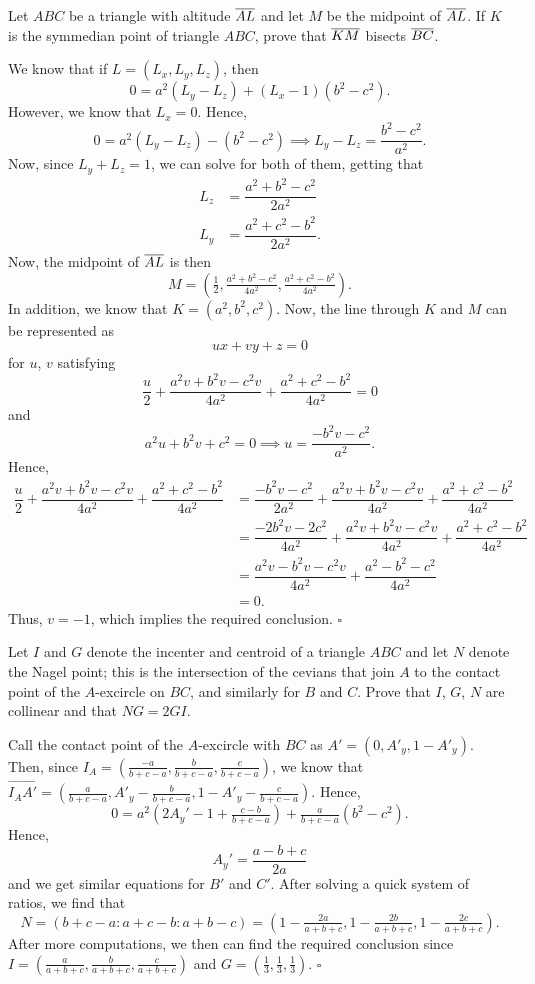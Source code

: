 \documentclass{article}
\begin{document}
\begin{problem}[7.31]{}
Let $ABC$ be a triangle with altitude $\overline{AL}$ and let $M$ be the midpoint of $\overline{AL}$. If $K$ is the symmedian point of triangle $ABC$, prove that $\overline{KM}$ bisects $\overline{BC}$.
\end{problem}
We know that if $L = (L_x, L_y, L_z)$, then \[0 = a^2(L_y-L_z)+(L_x-1)(b^2-c^2).\] However, we know that $L_x = 0$. Hence, \[0 = a^2(L_y-L_z)-(b^2-c^2) \implies L_y-L_z = \dfrac{b^2-c^2}{a^2}.\] Now, since $L_y + L_z = 1$, we can solve for both of them, getting that
\begin{align*}
L_z &= \dfrac{a^2+b^2-c^2}{2a^2} \\
L_y &= \dfrac{a^2+c^2-b^2}{2a^2}.
\end{align*}
Now, the midpoint of $\overline{AL}$ is then \[M = \left(\tfrac{1}{2}, \tfrac{a^2+b^2-c^2}{4a^2}, \tfrac{a^2+c^2-b^2}{4a^2}\right).\] In addition, we know that $K = (a^2, b^2, c^2)$. Now, the line through $K$ and $M$ can be represented as \[ux+vy+z = 0\] for $u$, $v$ satisfying \[\dfrac{u}{2}+\dfrac{a^2v+b^2v-c^2v}{4a^2}+\dfrac{a^2+c^2-b^2}{4a^2} = 0\] and \[a^2u+b^2v+c^2 = 0 \implies u = \dfrac{-b^2v-c^2}{a^2}.\] Hence,
\begin{align*}
\dfrac{u}{2}+\dfrac{a^2v+b^2v-c^2v}{4a^2}+\dfrac{a^2+c^2-b^2}{4a^2} &= \dfrac{-b^2v-c^2}{2a^2}+\dfrac{a^2v+b^2v-c^2v}{4a^2}+\dfrac{a^2+c^2-b^2}{4a^2} \\
&= \dfrac{-2b^2v-2c^2}{4a^2}+\dfrac{a^2v+b^2v-c^2v}{4a^2}+\dfrac{a^2+c^2-b^2}{4a^2} \\
&= \dfrac{a^2v-b^2v-c^2v}{4a^2}+\dfrac{a^2-b^2-c^2}{4a^2} \\
&= 0.
\end{align*}
Thus, $v = -1$, which implies the required conclusion. $\square$

\begin{problem}[7.32]{}
Let $I$ and $G$ denote the incenter and centroid of a triangle $ABC$ and let $N$ denote the Nagel point; this is the intersection of the cevians that join $A$ to the contact point of the $A$-excircle on $BC$, and similarly for $B$ and $C$. Prove that $I$, $G$, $N$ are collinear and that $NG = 2GI$.
\end{problem}
Call the contact point of the $A$-excircle with $BC$ as $A' = (0, A'_y, 1-A'_y)$. Then, since $I_A = \left(\tfrac{-a}{b+c-a}, \tfrac{b}{b+c-a}, \tfrac{c}{b+c-a}\right)$, we know that $\overrightarrow{I_AA'} = \left(\tfrac{a}{b+c-a}, A'_y-\tfrac{b}{b+c-a}, 1-A'_y-\tfrac{c}{b+c-a}\right)$. Hence, \[0 = a^2\left(2A_y'-1+\tfrac{c-b}{b+c-a}\right)+\tfrac{a}{b+c-a}\left(b^2-c^2\right).\] Hence, \[A_y' = \dfrac{a-b+c}{2a}\] and we get similar equations for $B'$ and $C'$. After solving a quick system of ratios, we find that \[N = (b+c-a : a+c-b : a+b-c) = \left(1-\tfrac{2a}{a+b+c}, 1-\tfrac{2b}{a+b+c}, 1-\tfrac{2c}{a+b+c}\right).\] After more computations, we then can find the required conclusion since $I = \left(\tfrac{a}{a+b+c}, \tfrac{b}{a+b+c}, \tfrac{c}{a+b+c}\right)$ and $G = \left(\tfrac{1}{3}, \tfrac{1}{3}, \tfrac{1}{3}\right)$. $\square$
\end{document}

